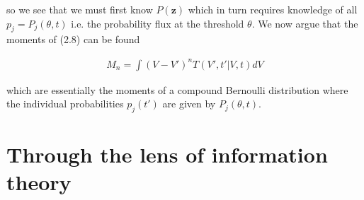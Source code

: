 \documentclass{ucetd}
\begin{document}
so we see that we must first know $P(\mathbf{z})$ which in turn requires knowledge of all $p_{j} = P_{j}(\theta, t)$ i.e. the probability flux at the threshold $\theta$. We now argue that the moments of (2.8) can be found 

\begin{align}
M_{n} = \int (V-V')^{n} T(V',t'|V,t) dV
\end{align}

which are essentially the moments of a compound Bernoulli distribution where the individual probabilities $p_{j}(t')$ are given by $P_{j}(\theta, t)$.

\section{Through the lens of information theory}
\end{document}
